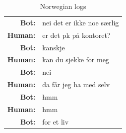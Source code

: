 \documentclass{article}
\begin{document}
\begin{table}[hbt!]
\begin{minipage}{.5\linewidth}
\begin{tabular}{rp{10cm}}
    \textbf{Bot:} & nei det er ikke noe særlig\\
    \textbf{Human:} & er det pk på kontoret?\\
    \textbf{Bot:} & kanskje\\
    \textbf{Human:} & kan du sjekke for meg\\
    \textbf{Bot:} & nei\\
    \textbf{Human:} & da får jeg ha med selv\\
    \textbf{Bot:} & hmm\\
    \textbf{Human:} & hmm\\
    \textbf{Bot:} & for et liv\\
  \end{tabular}
\end{minipage}%
\caption{Norwegian logs}
\end{table}
\end{document}
